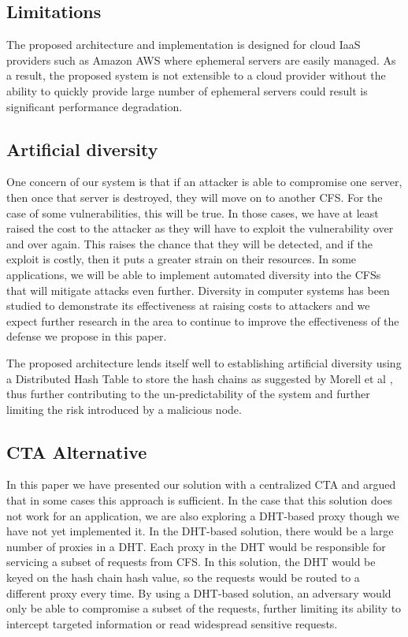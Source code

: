 \documentclass[a4paper,twoside]{article}
\begin{document}
\subsection{Limitations}
The proposed architecture and implementation is designed for cloud IaaS providers such as Amazon AWS where ephemeral servers are easily managed.  As a result, the proposed system is not extensible to a cloud provider without the ability to quickly provide large number of ephemeral servers  could result is significant performance degradation.


\subsection{Artificial diversity}

One concern of our system is that if an attacker is able to compromise one server, then once that server is destroyed, they will move on to another CFS.  For the case of some vulnerabilities, this will be true.  In those cases, we have at least raised the cost to the attacker as they will have to exploit the vulnerability over and over again.  This raises the chance that they will be detected, and if the exploit is costly, then it puts a greater strain on their resources.  In some applications, we will be able to implement automated diversity into the CFSs that will mitigate attacks even further.  Diversity in computer systems \cite{forrest_building_1997, littlewood_redundancy_2004, cox_n-variant_2006} has been studied to demonstrate its effectiveness at raising costs to attackers and we expect further research in the area to continue to improve the effectiveness of the defense we propose in this paper.  

The proposed architecture lends itself well to establishing artificial diversity using a Distributed Hash Table to store the hash chains as suggested by Morell et al \cite{morrell_dht_2015}, thus further contributing to the un-predictability of the system and further limiting the risk introduced by a malicious node. 

\subsection{CTA Alternative}

In this paper we have presented our solution with a centralized CTA and argued that in some cases this approach is sufficient.  In the case that this solution does not work for an application, we are also exploring a DHT-based proxy though we have not yet implemented it.  In the DHT-based solution, there would be a large number of proxies in a DHT.  Each proxy in the DHT would be responsible for servicing a subset of requests from CFS.  In this solution, the DHT would be keyed on the hash chain hash value, so the requests would be routed to a different proxy every time.  By using a DHT-based solution, an adversary would only be able to compromise a subset of the requests, further limiting its ability to intercept targeted information or read widespread sensitive requests.  
\end{document}
